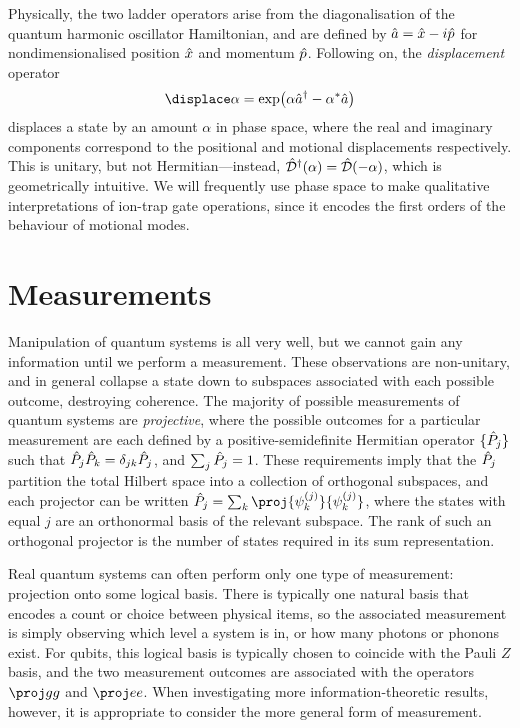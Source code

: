Physically, the two ladder operators arise from the diagonalisation of the quantum harmonic oscillator Hamiltonian, and are defined by $\hat{a} = \hat{x} - i\hat{p}$ for nondimensionalised position $\hat{x}$ and momentum $\hat{p}$.
Following on, the \emph{displacement} operator
\begin{equation}\label{eq:qi-displace}
\displace\alpha = \exp\bigl(\alpha\a^\dagger - \alpha^*\a\bigr)
\end{equation}
displaces a state by an amount $\alpha$ in phase space, where the real and imaginary components correspond to the positional and motional displacements respectively.
This is unitary, but not Hermitian---instead, $\hat{\mathcal D}^\dagger(\alpha) = \hat{\mathcal D}(-\alpha)$, which is geometrically intuitive.
We will frequently use phase space to make qualitative interpretations of ion-trap gate operations, since it encodes the first orders of the behaviour of motional modes.


\section{Measurements}
\label{sec:qi-measurement}

Manipulation of quantum systems is all very well, but we cannot gain any information until we perform a measurement.
These observations are non-unitary, and in general collapse a state down to subspaces associated with each possible outcome, destroying coherence.
The majority of possible measurements of quantum systems are \emph{projective}, where the possible outcomes for a particular measurement are each defined by a positive-semidefinite Hermitian operator $\{\hat{P}_j\}$ such that $\hat{P}_j \hat{P}_k = \delta_{jk}\hat{P}_j$, and $\sum_j\hat{P}_j = 1$.
These requirements imply that the $\hat{P}_j$ partition the total Hilbert space into a collection of orthogonal subspaces, and each projector can be written $\op P_j = \sum_k^{\vphantom{(j)}} \proj{\psi^{(j)}_k}{\psi^{(j)}_k}$, where the states with equal $j$ are an orthonormal basis of the relevant subspace.
The rank of such an orthogonal projector is the number of states required in its sum representation.

Real quantum systems can often perform only one type of measurement: projection onto some logical basis.
There is typically one natural basis that encodes a count or choice between physical items, so the associated measurement is simply observing which level a system is in, or how many photons or phonons exist.
For qubits, this logical basis is typically chosen to coincide with the Pauli $Z$ basis, and the two measurement outcomes are associated with the operators $\proj gg$ and $\proj ee$.
When investigating more information-theoretic results, however, it is appropriate to consider the more general form of measurement.

